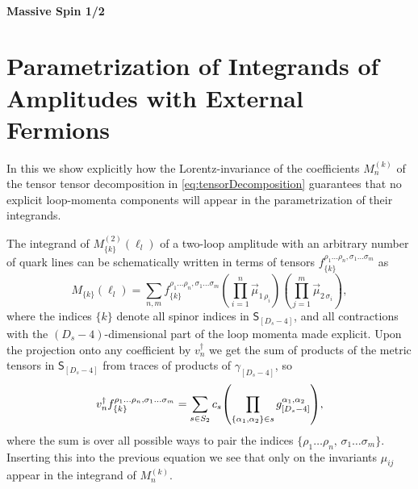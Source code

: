 \subsubsection{Massive Spin 1/2}






\chapter{Parametrization of Integrands of Amplitudes with External Fermions}
\label{sec:ParamIntegrands}

In this  we show
explicitly how the Lorentz-invariance of the coefficients $M_n^{(k)}$ of the
tensor tensor decomposition in \cref{eq:tensorDecomposition} guarantees that
no explicit loop-momenta components will appear in the parametrization of their integrands.


The integrand of $M^{(2)}_{\{k\}}(\ell_l)$ of a two-loop amplitude with an arbitrary
number of quark lines can be schematically written in terms of tensors $f^{\rho_1 \ldots \rho_n, \sigma_1\ldots \sigma_m}_{\{k\}}$ as
\begin{equation} 
  M_{\{k\}}(\ell_l) = \sum_{n,m} f^{\rho_1 \ldots \rho_n, \sigma_1 \ldots \sigma_m}_{\{k\}}
  \left(\prod_{i=1}^n \vec{\mu}_{1 \, \rho_i}\right)
  \left(\prod_{j=1}^m \vec{\mu}_{2 \, \sigma_i}\right),
\end{equation}
where the indices $\{k\}$ denote all spinor indices in  $\mathsf{S}_{[D_s-4]}$,
and all contractions with the $(D_s-4)$-dimensional part of the loop momenta made explicit.
Upon the projection onto any coefficient by $v_n^\dagger$ we get the sum of products of the metric tensors in $\mathsf{S}_{[D_s-4]}$
from traces of products of $\gamma_{[D_s-4]}$, so 
\begin{equation}
  v_n^\dagger f^{\rho_1 \ldots \rho_n, \sigma_1 \ldots \sigma_m}_{\{k\}}  = \sum_{s\in S_2} c_s \qty(\prod_{\{\alpha_1,\alpha_2\}\in s} g^{\alpha_1,\alpha_2}_{[D_s-4]}),
\end{equation}
where the sum is over all possible ways to pair the indices $\{ \rho_1 \ldots \rho_n,\,\sigma_1 \ldots \sigma_m \}$.
Inserting this into the previous equation we see that only on the invariants $\mu_{ij}$ appear in the integrand of $M_n^{(k)}$.



